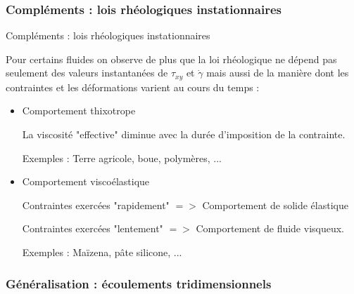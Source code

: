 \subsubsection{Compléments : lois rhéologiques instationnaires}
\begin{frame}{Compléments : lois rhéologiques instationnaires}

\small
\bigskip

Pour certains fluides on observe de plus que la loi rhéologique ne dépend pas seulement des valeurs instantanées de 
$\tau_{xy}$ et $\dot{\gamma}$ mais aussi de la  manière dont les contraintes et les déformations varient au cours du temps :

\begin{itemize}

\item Comportement thixotrope

La viscosité "effective" diminue avec la durée d'imposition de la contrainte.

Exemples : Terre agricole, boue, polymères, ...

\item Comportement viscoélastique 

Contraintes exercées "rapidement" $=>$ Comportement de solide élastique 

Contraintes exercées "lentement" $=>$ Comportement de fluide visqueux. 

Exemples : Maïzena, pâte silicone, ...


\end{itemize}



\end{frame}




\subsubsection{Généralisation : écoulements tridimensionnels}
 

